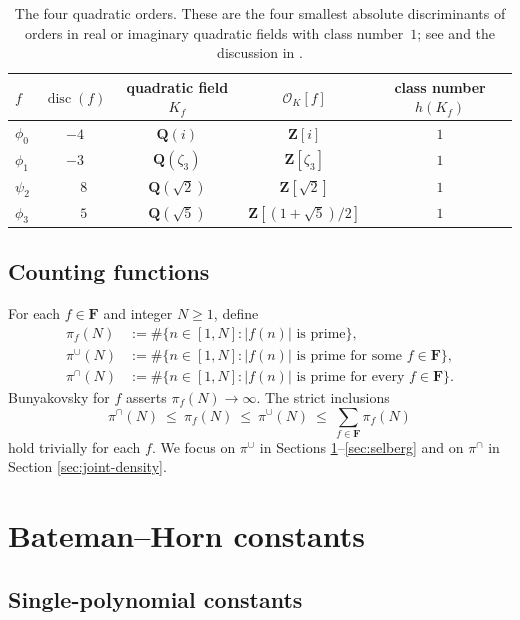 \documentclass[11pt]{article}
\theoremstyle{definition}
\newcommand{\Z}{\mathbf{Z}}
\newcommand{\Q}{\mathbf{Q}}
\newcommand{\F}{\mathbf{F}}
\newcommand{\OK}{\mathcal{O}_K}
\newcommand{\F}{\mathcal{F}}
\DeclareMathOperator{\disc}{disc}
\begin{document}
\begin{table}[h]
\centering
\begin{tabular}{lcccc}
\toprule
$f$ & $\disc(f)$ & quadratic field $K_f$ & $\OK[f]$ & class number $h(K_f)$\\
\midrule
$\phi_0$ & $-4$ & $\Q(i)$ & $\Z[i]$ & $1$\\
$\phi_1$ & $-3$ & $\Q(\zeta_3)$ & $\Z[\zeta_3]$ & $1$\\
$\psi_2$ & $\phantom{-}8$ & $\Q(\sqrt 2)$ & $\Z[\sqrt 2]$ & $1$\\
$\phi_3$ & $\phantom{-}5$ & $\Q(\sqrt 5)$ & $\Z[(1+\sqrt 5)/2]$ & $1$\\
\bottomrule
\end{tabular}
\caption{The four quadratic orders. These are the four smallest absolute discriminants of orders in real or imaginary quadratic fields with class number~$1$; see \cite[Cox]{cox} and the discussion in \cite{B2}.}\label{tab:disc}
\end{table}

\subsection{Counting functions}

For each $f\in\F$ and integer $N\ge 1$, define
\begin{align*}
\pi_f(N) &:= \#\{n\in[1,N] : |f(n)|\text{ is prime}\},\\
\pi^\cup(N) &:= \#\{n\in[1,N] : |f(n)|\text{ is prime for some }f\in\F\},\\
\pi^\cap(N) &:= \#\{n\in[1,N] : |f(n)|\text{ is prime for every }f\in\F\}.
\end{align*}
Bunyakovsky for $f$ asserts $\pi_f(N)\to\infty$. The strict inclusions
\[
\pi^\cap(N)\ \le\ \pi_f(N)\ \le\ \pi^\cup(N)\ \le\ \sum_{f\in\F}\pi_f(N)
\]
hold trivially for each $f$. We focus on $\pi^\cup$ in Sections \ref{sec:bh}--\ref{sec:selberg} and on $\pi^\cap$ in Section \ref{sec:joint-density}.

\section{Bateman--Horn constants}\label{sec:bh}

\subsection{Single-polynomial constants}
\end{document}

